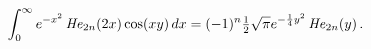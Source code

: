 \[\int_{0}^{\infty}e^{-x^{2}}\mathop{\mathit{He}_{2n}\/}\nolimits\!\left(2x%
\right)\mathop{\cos\/}\nolimits\!\left(xy\right)dx=(-1)^{n}\tfrac{1}{2}\sqrt{%
\pi}e^{-\frac{1}{4}y^{2}}\mathop{\mathit{He}_{2n}\/}\nolimits\!\left(y\right).\]